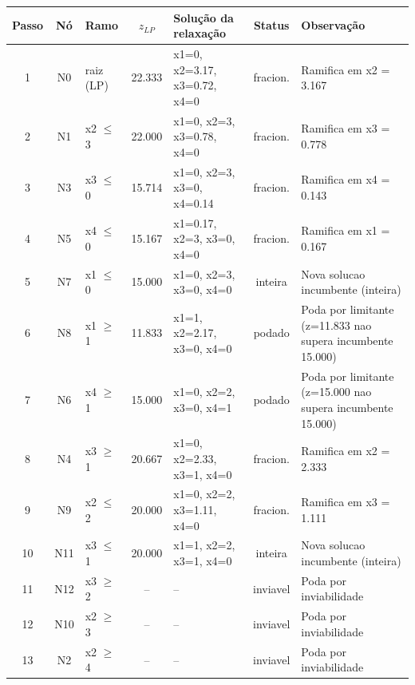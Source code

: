 \begin{footnotesize}
\begin{longtable}{c c l c l c p{4.2cm}}
\toprule
Passo & N\'o & Ramo & $z_{LP}$ & Solu\c{c}\~ao da relaxa\c{c}\~ao & Status & Observa\c{c}\~ao \\
\midrule
\endhead
1 & N0 & raiz (LP) & 22.333 & x1=0, x2=3.17, x3=0.72, x4=0 & fracion. & Ramifica em x2 = 3.167 \\
2 & N1 & x2 $\leq$ 3 & 22.000 & x1=0, x2=3, x3=0.78, x4=0 & fracion. & Ramifica em x3 = 0.778 \\
3 & N3 & x3 $\leq$ 0 & 15.714 & x1=0, x2=3, x3=0, x4=0.14 & fracion. & Ramifica em x4 = 0.143 \\
4 & N5 & x4 $\leq$ 0 & 15.167 & x1=0.17, x2=3, x3=0, x4=0 & fracion. & Ramifica em x1 = 0.167 \\
5 & N7 & x1 $\leq$ 0 & 15.000 & x1=0, x2=3, x3=0, x4=0 & inteira & Nova solucao incumbente (inteira) \\
6 & N8 & x1 $\geq$ 1 & 11.833 & x1=1, x2=2.17, x3=0, x4=0 & podado & Poda por limitante (z=11.833 nao supera incumbente 15.000) \\
7 & N6 & x4 $\geq$ 1 & 15.000 & x1=0, x2=2, x3=0, x4=1 & podado & Poda por limitante (z=15.000 nao supera incumbente 15.000) \\
8 & N4 & x3 $\geq$ 1 & 20.667 & x1=0, x2=2.33, x3=1, x4=0 & fracion. & Ramifica em x2 = 2.333 \\
9 & N9 & x2 $\leq$ 2 & 20.000 & x1=0, x2=2, x3=1.11, x4=0 & fracion. & Ramifica em x3 = 1.111 \\
10 & N11 & x3 $\leq$ 1 & 20.000 & x1=1, x2=2, x3=1, x4=0 & inteira & Nova solucao incumbente (inteira) \\
11 & N12 & x3 $\geq$ 2 & -- & -- & inviavel & Poda por inviabilidade \\
12 & N10 & x2 $\geq$ 3 & -- & -- & inviavel & Poda por inviabilidade \\
13 & N2 & x2 $\geq$ 4 & -- & -- & inviavel & Poda por inviabilidade \\
\bottomrule
\end{longtable}
\end{footnotesize}
